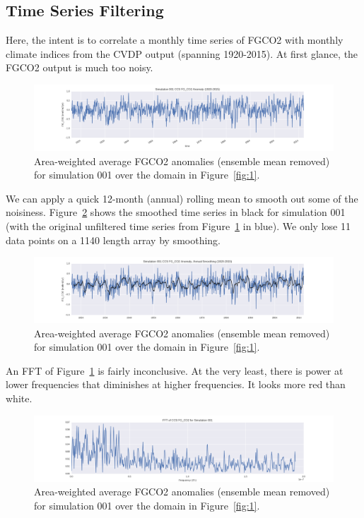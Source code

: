 \documentclass[12pt]{article}
\begin{document}
\subsection{Time Series Filtering}
Here, the intent is to correlate a monthly time series of FGCO2 with monthly climate indices from the CVDP output (spanning 1920-2015). At first glance, the FGCO2 output is much too noisy.
\begin{figure}[!h]
	\centering
	\includegraphics[width=\linewidth]{../../figs/CCS/timeseries/ccs-unfiltered-fgco2-series-example.png}
	\caption{Area-weighted average FGCO2 anomalies (ensemble mean removed) for simulation 001 over the domain in Figure~\ref{fig:1}.}
	\label{fig:2}
\end{figure}

We can apply a quick 12-month (annual) rolling mean to smooth out some of the noisiness. Figure~\ref{fig:3} shows the smoothed time series in black for simulation 001 (with the original unfiltered time series from Figure~\ref{fig:2} in blue). We only lose 11 data points on a 1140 length array by smoothing. 
\begin{figure}[!h]
	\centering
	\includegraphics[width=\linewidth]{../../figs/CCS/timeseries/ccs-filtered-fgco2-series-example.png}
	\caption{Area-weighted average FGCO2 anomalies (ensemble mean removed) for simulation 001 over the domain in Figure~\ref{fig:1}.}
	\label{fig:3}
\end{figure}

An FFT of Figure~\ref{fig:2} is fairly inconclusive. At the very least, there is power at lower frequencies that diminishes at higher frequencies. It looks more red than white.
\newpage
\begin{figure}[!h]
	\centering
	\includegraphics[width=\linewidth]{../../figs/CCS/fft/fft-CCS-001-frequencyHz.png}
	\caption{Area-weighted average FGCO2 anomalies (ensemble mean removed) for simulation 001 over the domain in Figure~\ref{fig:1}.}
	\label{fig:4}
\end{figure}
\end{document}
